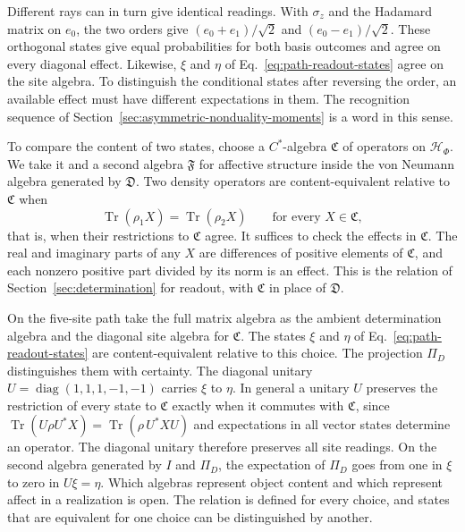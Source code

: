 \documentclass[11pt]{article}
\theoremstyle{definition}
\DeclareMathOperator{\Tr}{Tr}
\begin{document}
Different rays can in turn give identical readings. With $\sigma_z$ and the Hadamard matrix on $e_0$, the two orders give $(e_0+e_1)/\sqrt2$ and $(e_0-e_1)/\sqrt2$. These orthogonal states give equal probabilities for both basis outcomes and agree on every diagonal effect. Likewise, $\xi$ and $\eta$ of Eq.~\eqref{eq:path-readout-states} agree on the site algebra. To distinguish the conditional states after reversing the order, an available effect must have different expectations in them. The recognition sequence of Section~\ref{sec:asymmetric-nonduality-moments} is a word in this sense.

To compare the content of two states, choose a $C^*$-algebra $\mathfrak C$ of operators on $\mathcal H_\Phi$. We take it and a second algebra $\mathfrak F$ for affective structure inside the von Neumann algebra generated by $\mathfrak D$. Two density operators are content-equivalent relative to $\mathfrak C$ when
\begin{equation}
 \Tr(\rho_1X)=\Tr(\rho_2X)\qquad\text{for every }X\in\mathfrak C ,
 \label{eq:family-content-equivalence}
\end{equation}
that is, when their restrictions to $\mathfrak C$ agree. It suffices to check the effects in $\mathfrak C$. The real and imaginary parts of any $X$ are differences of positive elements of $\mathfrak C$, and each nonzero positive part divided by its norm is an effect. This is the relation of Section~\ref{sec:determination} for readout, with $\mathfrak C$ in place of $\mathfrak D$.

On the five-site path take the full matrix algebra as the ambient determination algebra and the diagonal site algebra for $\mathfrak C$. The states $\xi$ and $\eta$ of Eq.~\eqref{eq:path-readout-states} are content-equivalent relative to this choice. The projection $\Pi_D$ distinguishes them with certainty. The diagonal unitary $U=\operatorname{diag}(1,1,1,-1,-1)$ carries $\xi$ to $\eta$. In general a unitary $U$ preserves the restriction of every state to $\mathfrak C$ exactly when it commutes with $\mathfrak C$, since $\Tr(U\rho U^*X)=\Tr(\rho\,U^*XU)$ and expectations in all vector states determine an operator. The diagonal unitary therefore preserves all site readings. On the second algebra generated by $I$ and $\Pi_D$, the expectation of $\Pi_D$ goes from one in $\xi$ to zero in $U\xi=\eta$. Which algebras represent object content and which represent affect in a realization is open. The relation is defined for every choice, and states that are equivalent for one choice can be distinguished by another.
\end{document}
